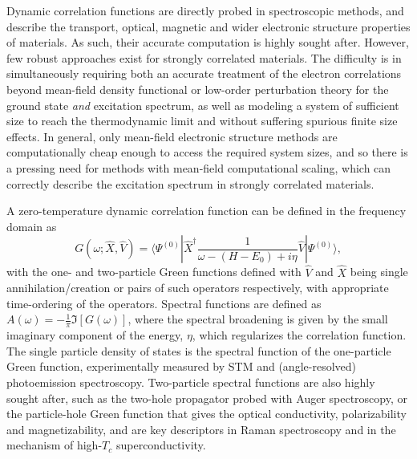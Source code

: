 \documentclass[aps,twocolumn,nobibnotes]{revtex4}
\begin{document}
Dynamic correlation functions are directly probed in spectroscopic methods,
and describe the transport, optical, magnetic and wider electronic structure properties of materials. 
As such, their accurate computation is highly sought after. 
However, few robust approaches exist for strongly correlated materials\cite{Gali2013}. The difficulty is in simultaneously requiring both an accurate 
treatment of the electron correlations beyond mean-field density functional or low-order perturbation theory for the ground state {\em and} excitation spectrum, as well as modeling 
a system of sufficient size to reach the thermodynamic limit and without suffering spurious finite size effects. 
In general, only mean-field electronic structure methods are computationally cheap enough to access the required system
sizes, and so there is a pressing need for methods with mean-field computational scaling, which can correctly describe 
the excitation spectrum in strongly correlated materials.

A zero-temperature dynamic correlation function can be defined in the frequency domain as
\begin{equation}
    G(\omega;{\hat X},{\hat V}) = \langle \Psi^{(0)} | {\hat X}^{\dagger} \frac{1}{\omega-(H-E_0)+i \eta} {\hat V} | \Psi^{(0)} \rangle , \label{eqn:intCorrFunc}
\end{equation}
with the one- and two-particle Green functions defined with ${\hat V}$ and ${\hat X}$ being single annihilation/creation or pairs of such operators 
respectively, with appropriate time-ordering of the operators. Spectral functions are defined as $A(\omega)=-\frac{1}{\pi}\Im[G(\omega)]$,
where the spectral broadening is given by the small imaginary component of the energy, $\eta$, which regularizes the correlation function. The single particle
density of states is the spectral function of the one-particle Green function, experimentally measured by STM 
and (angle-resolved) photoemission spectroscopy. Two-particle spectral functions are also highly sought after, such as the two-hole propagator 
probed with Auger spectroscopy\cite{Mona2013}, or the particle-hole Green function that gives the optical conductivity, polarizability and
magnetizability, and are key descriptors in 
Raman spectroscopy and in the mechanism of high-$T_c$ superconductivity\cite{Millis2012,Sordi2012,Millis2013}.
\end{document}
